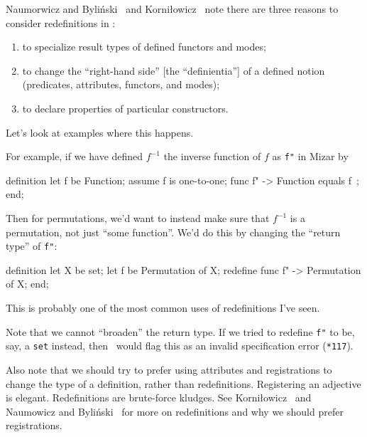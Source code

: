 \begin{node}[Redefinitions]\label{mizar-001O}%
Naumorwicz and Byli{\'n}ski~\cite{naumowicz2004improving} and Korni\l{}owicz~\cite{Korniowicz2016registrations} note there are three
reasons to consider redefinitions in \Mizar:
\begin{enumerate}
\item to specialize result types of defined functors and modes;
\item to change the ``right-hand side'' [the ``definientia''] of a
  defined notion (predicates, attributes, functors, and modes);
\item to declare properties of particular constructors.
\end{enumerate}
Let's look at examples where this happens.
\begin{node}\label{mizar-001P}%
For example, if we have defined $f^{-1}$ the inverse function of $f$ as
\verb|f"| in Mizar by
\begin{mizar}
definition
  let f be Function;
  assume f is one-to-one;
  func f" -> Function equals
  f~;
end;
\end{mizar}
Then for permutations, we'd want to instead make sure that $f^{-1}$ is a
permutation, not just ``some function''. We'd do this by changing the
``return type'' of \verb|f"|:
\begin{mizar}
definition
  let X be set;
  let f be Permutation of X;
  redefine func f" -> Permutation of X;
end;
\end{mizar}
This is probably one of the most common uses of redefinitions I've seen.

\begin{node}\label{mizar-001S}%
Note that we cannot ``broaden'' the return type. If we tried to redefine
\verb|f"| to be, say, a \texttt{set} instead, then \Mizar\ would flag
this as an invalid specification error (\texttt{*117}).
\end{node}
\begin{node}\label{mizar-001T}%
Also note that we should try to prefer using attributes and
registrations to change the type of a definition, rather than
redefinitions. Registering an adjective is elegant. Redefinitions are
brute-force kludges. See Korni\l{}owicz~\cite{Korniowicz2016registrations}
and Naumowicz and Byli{\'n}ski~\cite{naumowicz2004improving} for more on
redefinitions and why we should prefer registrations.
\end{node}
\end{node}


\end{node}
